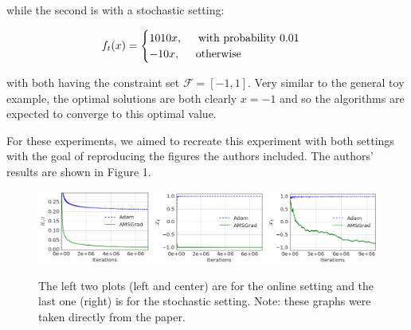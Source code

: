 \documentclass[letterpaper, 10 pt, conference]{ieeeconf}  %
\begin{document}
while the second is with a stochastic setting:

\[
    f_{t}(x) = 
    \begin{cases}
     	1010x, \hspace{5mm} \text{with probability 0.01}\\
        -10x, \hspace{5mm} \text{otherwise}
    \end{cases}
\]

with both having the constraint set $\mathcal{F} = [-1, 1]$. Very similar to the general toy example, the optimal solutions are both clearly $x = -1$ and so the algorithms are expected to converge to this optimal value. \par
For these experiments, we aimed to recreate this experiment with both settings with the goal of reproducing the figures the authors included. The authors' results are shown in Figure 1. 

\begin{figure}[]
\centering
\begin{minipage}{0.9\textwidth}
  \centering
  \includegraphics[width=1\linewidth]{OG_Results_synth.png}
  \label{fig:test1}
\end{minipage}%
\caption[]{The left two plots (left and center) are for the online setting and the last one (right) is for the stochastic setting. Note: these graphs were taken directly from the paper.}
\end{figure}
\end{document}
